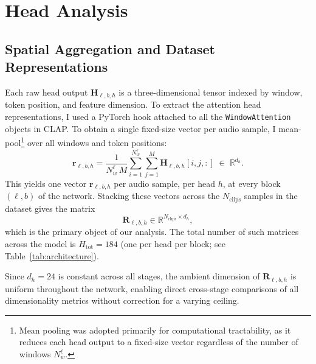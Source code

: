 
\section{Head Analysis}
\label{app:head_analysis}

\subsection{Spatial Aggregation and Dataset Representations}
\label{sec:aggregation}

Each raw head output $\mathbf{H}_{\ell,b,h}$ is a three-dimensional tensor
indexed by window, token position, and feature dimension. To extract the 
attention head representations, I used a PyTorch hook attached to all the 
\texttt{WindowAttention} objects in CLAP. To obtain a single
fixed-size vector per audio sample, I mean-pool\footnote{Mean pooling was adopted 
primarily for computational tractability,
as it reduces each head output to a fixed-size vector regardless of the
number of windows $N_w^\ell$.} over all windows and token
positions:
\begin{equation}
    \mathbf{r}_{\ell,b,h}
    = \frac{1}{N_w^\ell\, M}
      \sum_{i=1}^{N_w^\ell}\sum_{j=1}^{M}
      \mathbf{H}_{\ell,b,h}[i,j,:]
    \;\in\; \mathbb{R}^{d_h}.
    \label{eq:spatial_pooling}
\end{equation}
This yields one vector $\mathbf{r}_{\ell,b,h}$ per audio sample,
per head $h$, at every block $(\ell,b)$ of the network. Stacking these
vectors across the $N_{\text{clips}}$ samples in the dataset gives the matrix
\begin{equation}
    \mathbf{R}_{\ell,b,h} \in \mathbb{R}^{N_{\text{clips}} \times d_h},
\end{equation}
which is the primary object of our analysis. The total number of such
matrices across the model is $H_{\mathrm{tot}} = 184$ (one per head per
block; see Table~\ref{tab:architecture}).

Since $d_h = 24$ is constant across all stages, the ambient dimension of
$\mathbf{R}_{\ell,b,h}$ is uniform throughout the network, enabling direct
cross-stage comparisons of all dimensionality metrics without correction for
a varying ceiling. 

